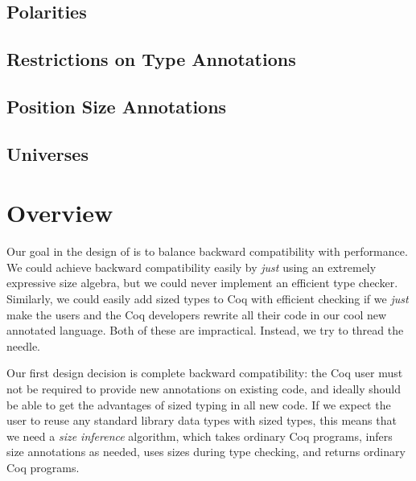 \subsection{Polarities}


\subsection{Restrictions on Type Annotations}


\subsection{Position Size Annotations}


\subsection{Universes}


\section{Overview}\label{sec:sponge-cake}
Our goal in the design of \lang is to balance backward compatibility with performance.
We could achieve backward compatibility easily by \emph{just} using an extremely expressive size algebra, but we could never implement an efficient type checker.
Similarly, we could easily add sized types to Coq with efficient checking if we \emph{just} make the users and the Coq developers rewrite all their code in our cool new annotated language.
Both of these are impractical.
Instead, we try to thread the needle.

Our first design decision is complete backward compatibility: the Coq user must not be required to provide new annotations on existing code, and ideally should be able to get the advantages of sized typing in all new code.
If we expect the user to reuse any standard library data types with sized types, this means that we need a \emph{size inference} algorithm, which takes ordinary Coq programs, infers size annotations as needed, uses sizes during type checking, and returns ordinary Coq programs.

